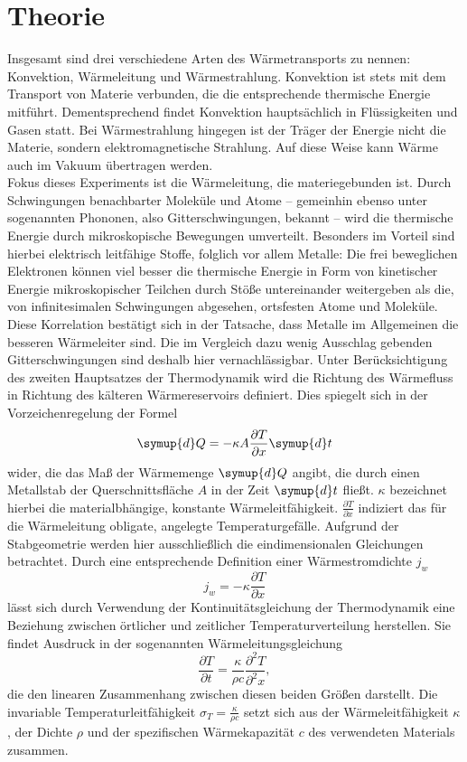 \section{Theorie}
\label{sec:Theorie}
Insgesamt sind drei verschiedene Arten des Wärmetransports zu nennen: Konvektion, Wärmeleitung und Wärmestrahlung. 
Konvektion ist stets mit dem Transport von Materie verbunden, die die entsprechende thermische Energie mitführt. 
Dementsprechend findet Konvektion hauptsächlich in Flüssigkeiten und Gasen statt.
Bei Wärmestrahlung hingegen ist der Träger der Energie nicht die Materie, sondern elektromagnetische Strahlung. 
Auf diese Weise kann Wärme auch im Vakuum übertragen werden. \\
Fokus dieses Experiments ist die Wärmeleitung, die materiegebunden ist. 
Durch Schwingungen benachbarter Moleküle und Atome -- gemeinhin ebenso unter sogenannten Phononen, also
Gitterschwingungen, bekannt -- wird die thermische Energie durch mikroskopische Bewegungen umverteilt.
Besonders im Vorteil sind hierbei elektrisch leitfähige Stoffe, folglich vor allem Metalle: Die frei beweglichen Elektronen 
können viel besser die thermische Energie in Form von kinetischer Energie mikroskopischer Teilchen durch 
Stöße untereinander weitergeben als die, von infinitesimalen Schwingungen abgesehen, ortsfesten Atome und Moleküle. 
Diese Korrelation bestätigt sich in der Tatsache, dass Metalle im Allgemeinen die besseren Wärmeleiter sind. 
Die im Vergleich dazu wenig Ausschlag gebenden Gitterschwingungen sind deshalb hier vernachlässigbar.
Unter Berücksichtigung des zweiten Hauptsatzes der Thermodynamik wird die Richtung des Wärmefluss in Richtung des 
kälteren Wärmereservoirs definiert. 
Dies spiegelt sich in der Vorzeichenregelung der Formel 
\begin{equation}
\symup{d}Q = - \kappa A \frac{\partial T}{\partial x} \symup{d}t 
\end{equation}
wider, die das Maß der Wärmemenge $\symup{d}Q$ angibt, die durch einen Metallstab der Querschnittsfläche $A$ in der Zeit 
$\symup{d}t$ fließt. 
$\kappa$ bezeichnet hierbei die materialbhängige, konstante Wärmeleitfähigkeit. 
$\frac{\partial T}{\partial x}$ indiziert das für die Wärmeleitung obligate, angelegte Temperaturgefälle.
Aufgrund der Stabgeometrie werden hier ausschließlich die eindimensionalen Gleichungen betrachtet.
Durch eine entsprechende Definition einer Wärmestromdichte $j_w$
\begin{equation}
j_w = - \kappa \frac{\partial T}{\partial x}
\end{equation}
lässt sich durch Verwendung der Kontinuitätsgleichung der Thermodynamik eine Beziehung zwischen örtlicher und zeitlicher 
Temperaturverteilung herstellen. 
Sie findet Ausdruck in der sogenannten Wärmeleitungsgleichung 
\begin{equation}
\frac{\partial T}{\partial t} = \frac{\kappa}{\rho c} \frac{\partial^2 T}{\partial^2 x} ,
\end{equation}
die den linearen Zusammenhang zwischen diesen beiden Größen darstellt. 
Die invariable Temperaturleitfähigkeit $\sigma_T = \frac{\kappa}{\rho c}$ setzt sich aus der Wärmeleitfähigkeit $\kappa$, 
der Dichte $\rho$ und der spezifischen Wärmekapazität $c$ des verwendeten Materials zusammen.
